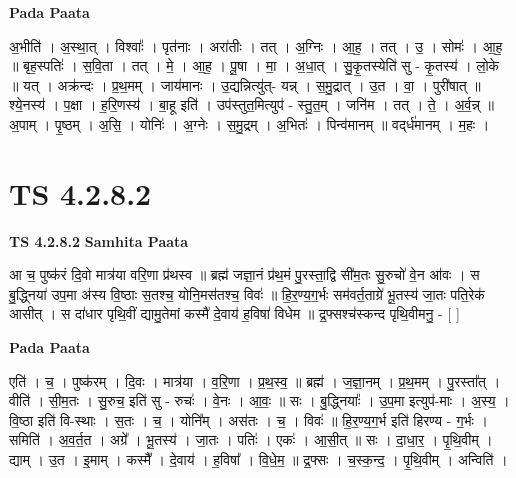 \documentclass[17pt]{extarticle}
\begin{document}
\textbf{Pada Paata} \newline

अ॒भीति॑ । अ॒स्था॒त् । विश्वाः᳚ । पृत॑नाः । अरा॑तीः । तत् । अ॒ग्निः । आ॒ह॒ । तत् । उ॒ । सोमः॑ । आ॒ह॒ ॥ बृह॒स्पतिः॑ । स॒वि॒ता । तत् । मे॒ । आ॒ह॒ । पू॒षा । मा॒ । अ॒धा॒त् । सु॒कृ॒तस्येति॑ सु - कृ॒तस्य॑ । लो॒के ॥ यत् । अक्र॑न्दः । प्र॒थ॒मम् । जाय॑मानः । उ॒द्यन्नित्यु॑त्- यन्न् । स॒मु॒द्रात् । उ॒त । वा॒ । पुरी॑षात् ॥ श्ये॒नस्य॑ । प॒क्षा । ह॒रि॒णस्य॑ । बा॒हू इति॑ । उप॑स्तुत॒मित्युप॑ - स्तु॒त॒म् । जनि॑म । तत् । ते॒ । अ॒र्व॒न्न् ॥ अ॒पाम् । पृ॒ष्ठम् । अ॒सि॒ । योनिः॑ । अ॒ग्नेः । स॒मु॒द्रम् । अ॒भितः॑ । पिन्व॑मानम् ॥ वद्‌र्ध॑मानम् । म॒हः ।  \newline




\section*{ TS 4.2.8.2 }

\textbf{TS 4.2.8.2 } \newline
\textbf{Samhita Paata} \newline

आ च॒ पुष्क॑रं दि॒वो मात्र॑या वरि॒णा प्र॑थस्व ॥ ब्रह्म॑ जज्ञा॒नं प्र॑थ॒मं पु॒रस्ता॒द्वि सी॑म॒तः सु॒रुचो॑ वे॒न आ॑वः । स बु॒द्ध्निया॑ उप॒मा अ॑स्य वि॒ष्ठाः स॒तश्च॒ योनि॒मस॑तश्च॒ विवः॑ ॥ हि॒र॒ण्य॒ग॒र्भः सम॑वर्त॒ताग्रे॑ भू॒तस्य॑ जा॒तः पति॒रेक॑ आसीत् । स दा॑धार पृथि॒वीं द्यामु॒तेमां कस्मै॑ दे॒वाय॑ ह॒विषा॑ विधेम ॥ द्र॒फ्सश्च॑स्कन्द पृथि॒वीमनु॒ - [  ] \newline

\textbf{Pada Paata} \newline

एति॑ । च॒ । पुष्क॑रम् । दि॒वः । मात्र॑या । व॒रि॒णा । प्र॒थ॒स्व॒ ॥ ब्रह्म॑ । ज॒ज्ञा॒नम् । प्र॒थ॒मम् । पु॒रस्ता᳚त् । वीति॑ । सी॒म॒तः । सु॒रुच॒ इति॑ सु - रुचः॑ । वे॒नः । आ॒वः॒ ॥ सः । बु॒द्ध्नियाः᳚ । उ॒प॒मा इत्युप॑-माः । अ॒स्य॒ । वि॒ष्ठा इति॑ वि-स्थाः । स॒तः । च॒ । योनि᳚म् । अस॑तः । च॒ । विवः॑ ॥ हि॒र॒ण्य॒ग॒र्भ इति॑ हिरण्य - ग॒र्भः । समिति॑ । अ॒व॒र्त॒त । अग्रे᳚ । भू॒तस्य॑ । जा॒तः । पतिः॑ । एकः॑ । आ॒सी॒त् ॥ सः । दा॒धा॒र॒ । पृ॒थि॒वीम् । द्याम् । उ॒त । इ॒माम् । कस्मै᳚ । दे॒वाय॑ । ह॒विषा᳚ । वि॒धे॒म॒ ॥ द्र॒फ्सः । च॒स्क॒न्द॒ । पृ॒थि॒वीम् । अन्विति॑ ।  \newline




\end{document}

